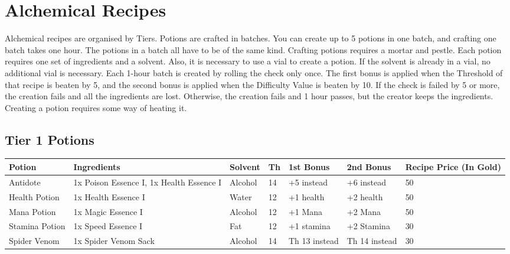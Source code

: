 \section{Alchemical Recipes}\label{sec:alchemicalRecipes}
Alchemical recipes are organised by Tiers.
Potions are crafted in batches.
You can create up to 5 potions in one batch, and crafting one batch takes one hour.
The potions in a batch all have to be of the same kind.
Crafting potions requires a mortar and pestle.
Each potion requires one set of ingredients and a solvent.
Also, it is necessary to use a vial to create a potion.
If the solvent is already in a vial, no additional vial is necessary.
Each 1-hour batch is created by rolling the check only once. 
The first bonus is applied when the Threshold of that recipe is beaten by 5, and the second bonus is applied when the Difficulty Value is beaten by 10.
If the check is failed by 5 or more, the creation fails and all the ingredients are lost.
Otherwise, the creation fails and 1 hour passes, but the creator keeps the ingredients.
Creating a potion requires some way of heating it.\\


\subsection{Tier 1 Potions}
\begin{longtable}{l | p{2.5cm} | l | l | p{1.5cm} | p{1.5cm} | p{1cm} }
	Potion & Ingredients & Solvent & Th & 1st Bonus & 2nd Bonus & Recipe Price (In Gold)\\ \hline
	Antidote & 1x Poison Essence I, 1x Health Essence I & Alcohol & 14 & +5 instead & +6 instead & 50\\
	Health Potion & 1x Health Essence I & Water & 12 & +1 health & +2 health & 50\\
	Mana Potion & 1x Magic Essence I & Alcohol & 12 & +1 Mana & +2 Mana & 50\\
	Stamina Potion & 1x Speed Essence I & Fat & 12 & +1 stamina & +2 Stamina & 30\\
	Spider Venom & 1x Spider Venom Sack & Alcohol & 14 & Th 13 instead & Th 14 instead & 30\\
\end{longtable}